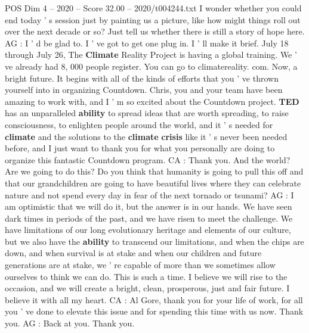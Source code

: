 \begin{textsample}{POS Dim 4 – 2020 – Score 32.00 – 2020/t004244.txt}
I wonder whether you could end today ' s session just by painting us a picture, like how might things roll out over the next decade or so?
Just tell us whether there is still a story of hope here.
AG : I ' d be glad to.
I ' ve got to get one plug in.
I ' ll make it brief.
July 18 through July 26, The \textbf{Climate} Reality Project is having a global training.
We ' ve already had 8, 000 people register.
You can go to climatereality. com.
Now, a bright future.
It begins with all of the kinds of efforts that you ' ve thrown yourself into in organizing Countdown.
Chris, you and your team have been amazing to work with, and I ' m so excited about the Countdown project. \textbf{TED} has an unparalleled \textbf{ability} to spread ideas that are worth spreading, to raise consciousness, to enlighten people around the world, and it ' s needed for \textbf{climate} and the solutions to the \textbf{climate} \textbf{crisis} like it ' s never been needed before, and I just want to thank you for what you personally are doing to organize this fantastic Countdown program.
CA : Thank you.
And the world?
Are we going to do this?
Do you think that humanity is going to pull this off and that our grandchildren are going to have beautiful lives where they can celebrate nature and not spend every day in fear of the next tornado or tsunami?
AG : I am optimistic that we will do it, but the answer is in our hands.
We have seen dark times in periods of the past, and we have risen to meet the challenge.
We have limitations of our long evolutionary heritage and elements of our culture, but we also have the \textbf{ability} to transcend our limitations, and when the chips are down, and when survival is at stake and when our children and future generations are at stake, we ' re capable of more than we sometimes allow ourselves to think we can do.
This is such a time.
I believe we will rise to the occasion, and we will create a bright, clean, prosperous, just and fair future.
I believe it with all my heart.
CA : Al Gore, thank you for your life of work, for all you ' ve done to elevate this issue and for spending this time with us now.
Thank you.
AG : Back at you.
Thank you.

\end{textsample}
